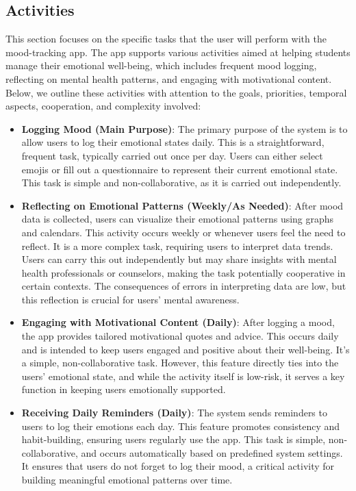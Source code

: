 \subsection{Activities}

This section focuses on the specific tasks that the user will perform with the mood-tracking app. The app supports various activities aimed at helping students manage their emotional well-being, which includes frequent mood logging, reflecting on mental health patterns, and engaging with motivational content. Below, we outline these activities with attention to the goals, priorities, temporal aspects, cooperation, and complexity involved:

\begin{itemize}
    \item \textbf{Logging Mood (Main Purpose)}: The primary purpose of the system is to allow users to log their emotional states daily. This is a straightforward, frequent task, typically carried out once per day. Users can either select emojis or fill out a questionnaire to represent their current emotional state. This task is simple and non-collaborative, as it is carried out independently.
    \item \textbf{Reflecting on Emotional Patterns (Weekly/As Needed)}: After mood data is collected, users can visualize their emotional patterns using graphs and calendars. This activity occurs weekly or whenever users feel the need to reflect. It is a more complex task, requiring users to interpret data trends. Users can carry this out independently but may share insights with mental health professionals or counselors, making the task potentially cooperative in certain contexts. The consequences of errors in interpreting data are low, but this reflection is crucial for users’ mental awareness.
    \item \textbf{Engaging with Motivational Content (Daily)}: After logging a mood, the app provides tailored motivational quotes and advice. This occurs daily and is intended to keep users engaged and positive about their well-being. It’s a simple, non-collaborative task. However, this feature directly ties into the users’ emotional state, and while the activity itself is low-risk, it serves a key function in keeping users emotionally supported.
    \item \textbf{Receiving Daily Reminders (Daily)}: The system sends reminders to users to log their emotions each day. This feature promotes consistency and habit-building, ensuring users regularly use the app. This task is simple, non-collaborative, and occurs automatically based on predefined system settings. It ensures that users do not forget to log their mood, a critical activity for building meaningful emotional patterns over time.

\end{itemize}
